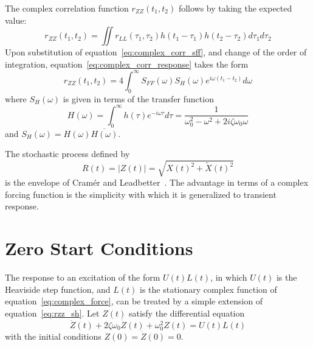 \documentclass[12pt]{article}
\begin{document}
The complex correlation function $r_{ZZ}(t_1, t_2)$ follows by taking the expected value:
\begin{equation}
    r_{ZZ}(t_1, t_2) = \iint r_{LL}(\tau_1, \tau_2) h(t_1 - \tau_1) h(t_2 - \tau_2) d\tau_1 d\tau_2
    \label{eq:complex_corr_response}
\end{equation}
Upon substitution of equation~\eqref{eq:complex_corr_sff}, and change of the order of integration, equation~\eqref{eq:complex_corr_response} takes the form
\begin{equation}
    r_{ZZ}(t_1, t_2) = 4 \int_0^{\infty} S_{FF}(\omega) S_H(\omega) e^{i\omega(t_1 - t_2)} d\omega
    \label{eq:rzz_sh}
\end{equation}
where $S_H(\omega)$ is given in terms of the transfer function
\begin{equation}
    H(\omega) = \int_0^\infty h(\tau) e^{-i\omega \tau} d\tau = \frac{1}{\omega_0^2 - \omega^2 + 2i\zeta\omega_0\omega}
    \label{eq:transfer_function}
\end{equation}
and $S_H(\omega) = H(\omega) \overline{H(\omega)}$.

The stochastic process defined by
\begin{equation}
    R(t) = |Z(t)| = \sqrt{X(t)^2 + \tilde{X}(t)^2}
    \label{eq:envelope}
\end{equation}
is the envelope of Cramér and Leadbetter~\cite{cramer1967}. The advantage in terms of a complex forcing function is the simplicity with which it is generalized to transient response.

\section{Zero Start Conditions}

The response to an excitation of the form $U(t)L(t)$, in which $U(t)$ is the Heaviside step function, and $L(t)$ is the stationary complex function of equation~\eqref{eq:complex_force}, can be treated by a simple extension of equation~\eqref{eq:rzz_sh}. Let $Z(t)$ satisfy the differential equation
\begin{equation}
    \ddot{Z}(t) + 2\zeta\omega_0 \dot{Z}(t) + \omega_0^2 Z(t) = U(t) L(t)
    \label{eq:zero_start}
\end{equation}
with the initial conditions $Z(0) = \dot{Z}(0) = 0$.
\end{document}
